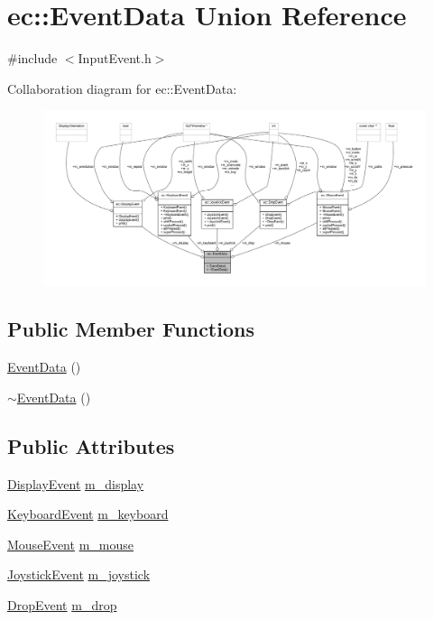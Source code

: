 \hypertarget{unionec_1_1_event_data}{}\section{ec\+:\+:Event\+Data Union Reference}
\label{unionec_1_1_event_data}


{\ttfamily \#include $<$Input\+Event.\+h$>$}



Collaboration diagram for ec\+:\+:Event\+Data\+:\nopagebreak
\begin{figure}[H]
\begin{center}
\leavevmode
\includegraphics[width=350pt]{unionec_1_1_event_data__coll__graph}
\end{center}
\end{figure}
\subsection*{Public Member Functions}
\begin{DoxyCompactItemize}
\item 
\mbox{\hyperlink{unionec_1_1_event_data_a8276eb2c2eee85aeb6d6911992affce6}{Event\+Data}} ()
\item 
\mbox{\hyperlink{unionec_1_1_event_data_a4f016745a6af3e6d4823afb8979f38ad}{$\sim$\+Event\+Data}} ()
\end{DoxyCompactItemize}
\subsection*{Public Attributes}
\begin{DoxyCompactItemize}
\item 
\mbox{\hyperlink{structec_1_1_display_event}{Display\+Event}} \mbox{\hyperlink{unionec_1_1_event_data_a557f2780b1d3eadf848b99a501a95f58}{m\+\_\+display}}
\item 
\mbox{\hyperlink{structec_1_1_keyboard_event}{Keyboard\+Event}} \mbox{\hyperlink{unionec_1_1_event_data_a76d355d62f63e9947187e08bc520af45}{m\+\_\+keyboard}}
\item 
\mbox{\hyperlink{structec_1_1_mouse_event}{Mouse\+Event}} \mbox{\hyperlink{unionec_1_1_event_data_a77d2274d869ab46f8f5f1e5d9616d4d3}{m\+\_\+mouse}}
\item 
\mbox{\hyperlink{structec_1_1_joystick_event}{Joystick\+Event}} \mbox{\hyperlink{unionec_1_1_event_data_ab45002b3b3e993ed2a6d4d2afb5a7a27}{m\+\_\+joystick}}
\item 
\mbox{\hyperlink{structec_1_1_drop_event}{Drop\+Event}} \mbox{\hyperlink{unionec_1_1_event_data_a3fc172a18118e8079ec35ecbeceddff1}{m\+\_\+drop}}
\end{DoxyCompactItemize}


